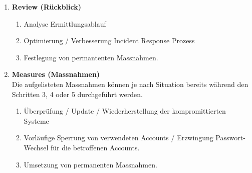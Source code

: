 \begin{enumerate}
\item \textbf{Review (Rückblick)}\\
\begin{enumerate}
\item Analyse Ermittlungsablauf
\item Optimierung / Verbesserung Incident Response Prozess
\item Festlegung von permantenten Massnahmen.
\end{enumerate}

\item \textbf{Measures (Massnahmen)}\\
Die aufgelisteten Massnahmen können je nach Situation bereits während den Schritten 3, 4 oder 5 durchgeführt werden.
\begin{enumerate}
\item Überprüfung / Update / Wiederherstellung der kompromittierten Systeme
\item Vorläufige Sperrung von verwendeten Accounts / Erzwingung Passwort-Wechsel für die betroffenen Accounts.
\item Umsetzung von permanenten Massnahmen.
\end{enumerate}
\end{enumerate}